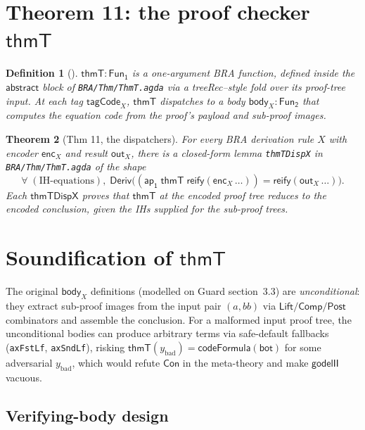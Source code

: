 \documentclass[11pt]{article}
\newtheorem{theorem}{Theorem}
\newtheorem{definition}[theorem]{Definition}
\newcommand{\Deriv}{\mathsf{Deriv}}
\newcommand{\thmT}{\mathsf{thmT}}
\newcommand{\Con}{\mathsf{Con}}
\newcommand{\bot}{\mathsf{bot}}
\newcommand{\FunOne}{\mathsf{Fun_1}}
\newcommand{\FunTwo}{\mathsf{Fun_2}}
\newcommand{\reify}{\mathsf{reify}}
\newcommand{\codeFormula}{\mathsf{codeFormula}}
\begin{document}
\section{Theorem 11: the proof checker $\thmT$}

\begin{definition}[\thmT]
$\thmT : \FunOne$ is a one-argument BRA function, defined inside the
$\mathsf{abstract}$ block of \verb|BRA/Thm/ThmT.agda| via a
treeRec--style fold over its proof-tree input.  At each tag
$\mathsf{tagCode}_X$, $\thmT$ dispatches to a body $\mathsf{body}_X :
\FunTwo$ that computes the equation code from the proof's payload and
sub-proof images.
\end{definition}

\begin{theorem}[Thm 11, the dispatchers]
For every BRA derivation rule $X$ with encoder $\mathsf{enc}_X$ and
result $\mathsf{out}_X$, there is a closed-form lemma
\verb|thmTDispX| in \verb|BRA/Thm/ThmT.agda| of the shape
\[
  \forall\; (\text{IH-equations}),\;
  \Deriv\big((\mathsf{ap_1}\;\thmT\;\reify(\mathsf{enc}_X\,\ldots)) =
            \reify(\mathsf{out}_X\,\ldots)\big).
\]
Each $\mathsf{thmTDispX}$ proves that $\thmT$ at the encoded proof
tree reduces to the encoded conclusion, given the IHs supplied for
the sub-proof trees.
\end{theorem}

\section{Soundification of $\thmT$}
\label{sec:sound}

The original $\mathsf{body}_X$ definitions (modelled on Guard
section~3.3) are \emph{unconditional}: they extract sub-proof images
from the input pair $(a,bb)$ via $\mathsf{Lift}/\mathsf{Comp}/\mathsf{Post}$
combinators and assemble the conclusion.  For a malformed input proof
tree, the unconditional bodies can produce arbitrary terms via
safe-default fallbacks (\verb|axFstLf|, \verb|axSndLf|), risking
$\thmT(y_{\text{bad}}) = \codeFormula(\bot)$ for some adversarial
$y_{\text{bad}}$, which would refute $\Con$ in the meta-theory and
make $\mathsf{godelII}$ vacuous.

\subsection{Verifying-body design}
\end{document}
